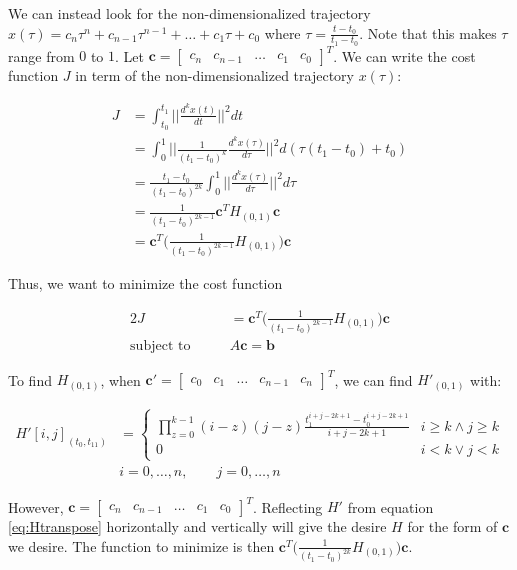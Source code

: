 \noindent We can instead look for the non-dimensionalized trajectory $x(\tau)=c_n\tau^n+c_{n-1}\tau^{n-1}+\dots+c_1\tau+c_0$ where $\tau=\frac{t-t_0}{t_1-t_0}$. Note that this makes $\tau$ range from $0$ to $1$. Let $\mathbf{c}=\begin{bmatrix}c_n & c_{n-1} & \dots & c_1 & c_0\end{bmatrix}^T$. We can write the cost function $J$ in term of the non-dimensionalized trajectory $x(\tau)$:

\begin{align}
	J &= \int_{t_0}^{t_1}\Bigg|\Bigg|\frac{d^kx(t)}{dt}\Bigg|\Bigg|^2dt \\
	&= \int_0^1\Bigg|\Bigg|\frac{1}{(t_1-t_0)^k}\frac{d^kx(\tau)}{d\tau}\Bigg|\Bigg|^2d(\tau(t_1-t_0)+t_0) \nonumber \\
	&= \frac{t_1-t_0}{(t_1-t_0)^{2k}}\int_0^1\Bigg|\Bigg|\frac{d^kx(\tau)}{d\tau}\Bigg|\Bigg|^2d\tau \nonumber \\
	&= \frac{1}{(t_1-t_0)^{2k-1}}\mathbf{c}^TH_{(0,1)}\mathbf{c} \nonumber \\
	&= \mathbf{c}^T\Bigg(\frac{1}{(t_1-t_0)^{2k-1}}H_{(0,1)}\Bigg)\mathbf{c} \nonumber
\end{align}

\noindent Thus, we want to minimize the cost function

\begin{alignat}{2}
	J &= \mathbf{c}^T\Bigg(\frac{1}{(t_1-t_0)^{2k-1}}H_{(0,1)}\Bigg)\mathbf{c} \\
	\text{subject to}\qquad & A\mathbf{c} = \mathbf{b} \nonumber
\end{alignat}

\noindent To find $H_{(0,1)}$, when $\mathbf{c}'=\begin{bmatrix}c_0 & c_1 & \dots & c_{n-1} & c_n\end{bmatrix}^T$, we can find $H'_{(0,1)}$ with:

\begin{align}
	H'[i,j]_{(t_0,t_11)} &=
	\begin{cases}
		\prod\limits_{z=0}^{k-1}(i-z)(j-z)\frac{t_1^{i+j-2k+1}-t_0^{i+j-2k+1}}{i+j-2k+1} & i\ge k \wedge j\ge k \\
		0 & i<k \vee j<k
	\end{cases} \label{eq:Htranspose} \\
	& i=0,\dots,n,\qquad j=0,\dots,n \nonumber
\end{align}

\noindent However, $\mathbf{c}=\begin{bmatrix}c_n & c_{n-1} & \dots & c_1 & c_0\end{bmatrix}^T$. Reflecting $H'$ from equation \eqref{eq:Htranspose} horizontally and vertically will give the desire $H$ for the form of $\mathbf{c}$ we desire. The function to minimize is then $\mathbf{c}^T\Bigg(\frac{1}{(t_1-t_0)^{2k}}H_{(0,1)}\Bigg)\mathbf{c}$.

